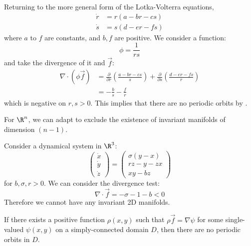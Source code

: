 \documentclass[../Main.tex]{subfiles}
\begin{document}
\begin{example}
    Returning to the more general form of the Lotka-Volterra equations,
    \begin{align*}
        \dot{r} &= r(a - br - c s) \\
        \dot{s} &= s(d - er - fs)
    \end{align*}
    where $a$ to $f$ are constants, and $b, f$ are positive. We consider a function:
    \begin{equation*}
        \phi = \frac1{rs}
    \end{equation*}
    and take the divergence of it and $\vec{f}$:
    \begin{align*}
        \nabla \cdot (\phi\vec f) &= \frac{\partial}{\partial r} \left(\frac{a-br-cs}{s}\right) + \frac{\partial }{\partial s}\left(\frac{d-er-fs}{r}\right) \\
        &= -\frac{b}{s} - \frac f r
    \end{align*}
    which is negative on $r, s > 0$. This implies that there are no periodic orbits by .
\end{example}
\begin{remark}
    For $\R^n$, we can adapt  to exclude the existence of invariant manifolds of dimension $(n-1)$.
\end{remark}
\begin{example}
    Consider a dynamical system in $\R^3$:
    \begin{equation*}
        \begin{pmatrix}\dot{x} \\ \dot y \\ \dot z\end{pmatrix} = \begin{pmatrix}\sigma(y-x) \\ rz-y-zx \\ xy-bz\end{pmatrix}
    \end{equation*}
    for $b, \sigma, r > 0$.
    We can consider the divergence test:
    \begin{equation*}
        \nabla \cdot \vec{f} = -\sigma-1-b < 0
    \end{equation*}
    Therefore we cannot have any invariant 2D manifolds.
\end{example}
\begin{theorem}
    If there exists a positive function $\rho(x, y)$ such that $\rho \vec{f} = \nabla \psi$ for some single-valued $\psi(x, y)$ on a simply-connected domain $D$, then there are no periodic orbits in $D$.
    \label{thmGradient}
\end{theorem}
\end{document}

